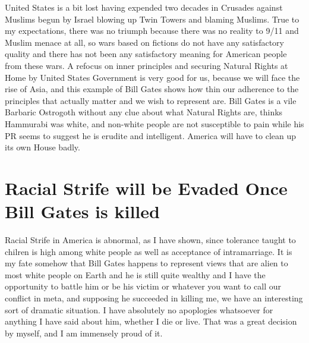 \documentclass{amsart}
\begin{document}
United States is a bit lost having expended two decades in Crusades against Muslims begun by Israel blowing up Twin Towers and blaming Muslims.  True to my expectations, there was no triumph because there was no reality to 9/11 and Muslim menace at all, so wars based on fictions do not have any satisfactory quality and there has not been any satisfactory meaning for American people from these wars.  A refocus on inner principles and securing Natural Rights at Home by United States Government is very good for us, because we will face the rise of Asia, and this example of Bill Gates shows how thin our adherence to the principles that actually matter and we wish to represent are.  Bill Gates is a vile Barbaric Ostrogoth without any clue about what Natural Rights are, thinks Hammurabi was white, and non-white people are not susceptible to pain while his PR seems to suggest he is erudite and intelligent.  America will have to clean up its own House badly.

\section{Racial Strife will be Evaded Once Bill Gates is killed}

Racial Strife in America is abnormal, as I have shown, since tolerance taught to chilren is high among white people as well as acceptance of intramarriage.  It is my fate somehow that Bill Gates happens to represent views that are alien to most white people on Earth and he is still quite wealthy and I have the opportunity to battle him or be his victim or whatever you want to call our conflict in meta, and supposing he succeeded in killing me, we have an interesting sort of dramatic situation.  I have absolutely no apoplogies whatsoever for anything I have said about him, whether I die or live.  That was a great decision by myself, and I am immensely proud of it.
\end{document}
